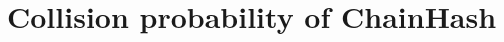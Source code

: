 \providecommand{\F}{\mathbb{F}}
\providecommand{\clnh}{\mathrm{CLNH}}
\providecommand{\lo}{\mathrm{lo}}
\providecommand{\hi}{\mathrm{hi}}
\providecommand{\iver}[1]{[\![#1]\!]}
\providecommand{\cf}[2]{[#1]\,#2}   %

\section{Collision probability of ChainHash}
\label{sec:ph}

